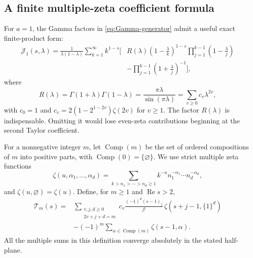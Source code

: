 \documentclass[11pt]{article}
\numberwithin{equation}{section}
\theoremstyle{definition}
\DeclareMathOperator{\Rea}{Re}
\newcommand{\JJ}{\mathcal J}
\begin{document}
\subsection{A finite multiple-zeta coefficient formula}
For $a=1$, the Gamma factors in \eqref{eq:Gamma-generator} admit a useful exact finite-product form:
\begin{equation}\label{eq:Gamma-products}
 \begin{split}
 \JJ_1(s,\lambda)=\frac1{\lambda(1-\lambda)}\sum_{k=1}^\infty k^{1-s}
 \Bigg[&R(\lambda)\left(1-\frac\lambda k\right)^{1-s}
       \prod_{j=1}^{k-1}\left(1-\frac\lambda j\right)\\
       &-\prod_{j=1}^{k-1}\left(1+\frac\lambda j\right)^{-1}\Bigg],
 \end{split}
\end{equation}
where
\begin{equation}\label{eq:R-even}
 R(\lambda)=\Gamma(1+\lambda)\Gamma(1-\lambda)
 =\frac{\pi\lambda}{\sin(\pi\lambda)}
 =\sum_{v\ge0}c_v\lambda^{2v},
\end{equation}
with $c_0=1$ and $c_v=2(1-2^{1-2v})\zeta(2v)$ for $v\ge1$.
The factor $R(\lambda)$ is indispensable. Omitting it would lose even-zeta contributions beginning at the second Taylor coefficient.

For a nonnegative integer $m$, let $\operatorname{Comp}(m)$ be the set of ordered compositions of $m$ into positive parts, with $\operatorname{Comp}(0)=\{\varnothing\}$. We use strict multiple zeta functions
\[
 \zeta(u,\alpha_1,\ldots,\alpha_d)
 =\sum_{k>n_1>\cdots>n_d\ge1}
 k^{-u}n_1^{-\alpha_1}\cdots n_d^{-\alpha_d},
\]
and $\zeta(u,\varnothing)=\zeta(u)$. Define, for $m\ge1$ and $\Rea s>2$,
\begin{equation}\label{eq:T-def}
 \begin{split}
 \mathcal T_m(s)={}&
 \sum_{\substack{v,j,d\ge0\\2v+j+d=m}}
 c_v\frac{(-1)^d(s-1)_j}{j!}\,
 \zeta(s+j-1,\{1\}^{d})\\
 &-(-1)^m\sum_{\alpha\in\operatorname{Comp}(m)}\zeta(s-1,\alpha).
 \end{split}
\end{equation}
All the multiple sums in this definition converge absolutely in the stated half-plane.
\end{document}
